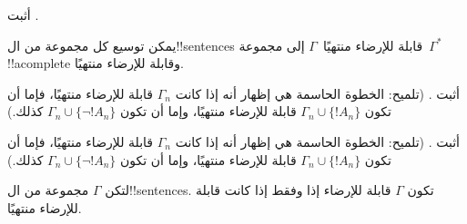 \documentclass[../../../include/open-logic-section]{subfiles}
\begin{document}

\begin{prob}
أثبت .
\end{prob}
\tagendprob

\begin{lem}
 يمكن توسيع كل مجموعة من ال!!{sentence}s
قابلة للإرضاء منتهيًا~$\Gamma$ إلى مجموعة~$\Gamma^*$ !!a{complete}
وقابلة للإرضاء منتهيًا.
\end{lem}

\begin{prob}
أثبت . (تلميح: الخطوة الحاسمة
هي إظهار أنه إذا كانت $\Gamma_n$ قابلة للإرضاء منتهيًا، فإما أن تكون
$\Gamma_n \cup \{!A_n\}$ قابلة للإرضاء منتهيًا، وإما أن تكون
$\Gamma_n \cup \{\lnot !A_n\}$ كذلك.)
\end{prob}
\tagendprob

\begin{prob}
أثبت . (تلميح: الخطوة الحاسمة
هي إظهار أنه إذا كانت $\Gamma_n$ قابلة للإرضاء منتهيًا، فإما أن تكون
$\Gamma_n \cup \{!A_n\}$ قابلة للإرضاء منتهيًا، وإما أن تكون
$\Gamma_n \cup \{\lnot !A_n\}$ كذلك.)
\end{prob}
\tagendprob

\begin{thm}[التراص]
 لتكن $\Gamma$ مجموعة من ال!!{sentence}s.
تكون $\Gamma$ قابلة للإرضاء إذا وفقط إذا كانت قابلة للإرضاء منتهيًا.
\end{thm}
\end{document}
